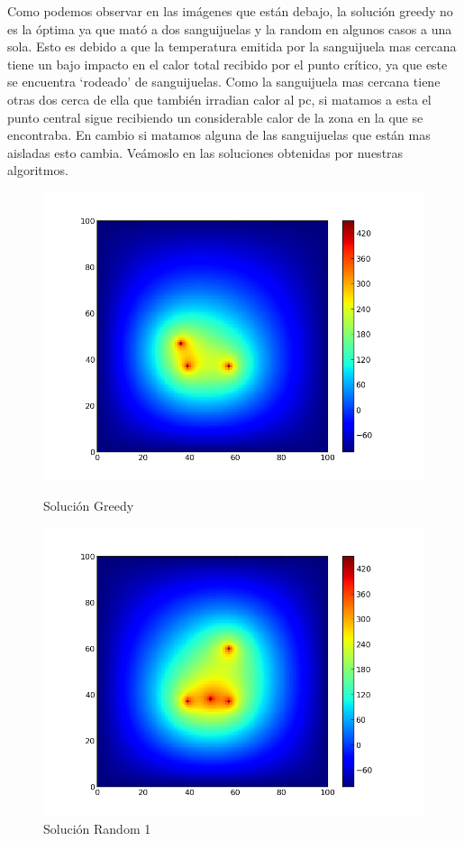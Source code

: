 Como podemos observar en las imágenes que están debajo, la solución greedy no es la óptima ya que mató a dos sanguijuelas y la random en algunos casos a una sola. Esto es debido a que la temperatura emitida por la sanguijuela mas cercana tiene un bajo impacto en el calor total recibido por el punto crítico, ya que este se encuentra `rodeado' de sanguijuelas. Como la sanguijuela mas cercana tiene otras dos cerca de ella que también irradian calor al pc, si matamos a esta el punto central sigue recibiendo un considerable calor de la zona en la que se encontraba. En cambio si matamos alguna de las sanguijuelas que están mas aisladas esto cambia. Veámoslo en las soluciones obtenidas por nuestras algoritmos. 
\clearpage
\begin{figure}[htb]
\begin{center}
\includegraphics[scale=0.40]{imagenes/test6_greedy.png} 
\caption{Solución Greedy} 

        \end{center}
\endminipage\hfill
{}
\begin{center}
\includegraphics[scale=0.40]{imagenes/test6_random.png} 
\caption{Solución Random 1} 
        \end{center}
\endminipage\hfill 
\end{figure}

